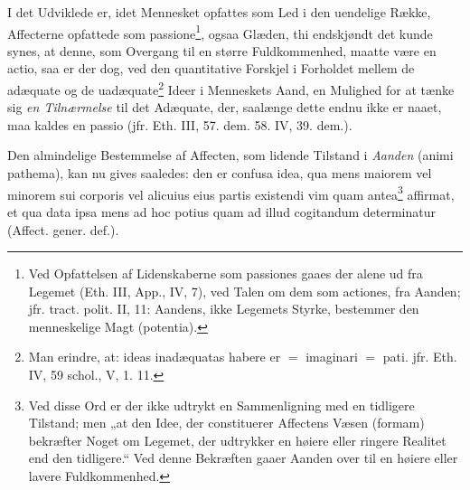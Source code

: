 \documentclass[12pt,a4paper]{book}
\newcommand{\opage}[1]{\marginnote{\footnotesize\textit{[#1]}}}
\begin{document}
\opage{119} \setcounter{footnote}{0}%
I det Udviklede er, idet Mennesket opfattes som Led i
den uendelige Række, Affecterne opfattede som
passione\footnote{Ved Opfattelsen af Lidenskaberne som passiones
gaaes der alene ud fra Legemet (Eth. III, App., IV, 7), ved
Talen om dem som actiones, fra Aanden; jfr. tract. polit. II,
11: Aandens, ikke Legemets Styrke, bestemmer den
menneskelige Magt (potentia).}, ogsaa Glæden, thi endskjøndt det kunde synes, at denne,
som Overgang til en større Fuldkommenhed, maatte være
en actio, saa er der dog, ved den quantitative Forskjel i
Forholdet mellem de adæquate og de
uadæquate\footnote{Man erindre, at: ideas inadæquatas habere
er $=$ imaginari $=$ pati. jfr. Eth. IV, 59 schol., V, 1. 11.} Ideer i
Menneskets Aand, en Mulighed for at tænke sig \emph{en Tilnærmelse}
til det Adæquate, der, saalænge dette endnu
ikke er naaet, maa kaldes en passio (jfr. Eth. III, 57. dem.
58. IV, 39. dem.).

Den almindelige Bestemmelse af Affecten, som lidende
Tilstand i \emph{Aanden} (animi pathema), kan nu gives saaledes:
den er
confusa idea, qua mens maiorem vel minorem
sui corporis vel alicuius eius partis existendi vim quam
antea\footnote{Ved disse Ord er der ikke udtrykt en
Sammenligning med en tidligere Tilstand; men „at den Idee,
der constituerer Affectens Væsen (formam) bekræfter Noget om
Legemet, der udtrykker en høiere eller ringere Realitet end
den tidligere.“ Ved denne Bekræften gaaer Aanden over til en
høiere eller lavere Fuldkommenhed.} affirmat, et qua data ipsa mens ad hoc potius quam
ad illud cogitandum determinatur (Affect. gener. def.).
\end{document}
